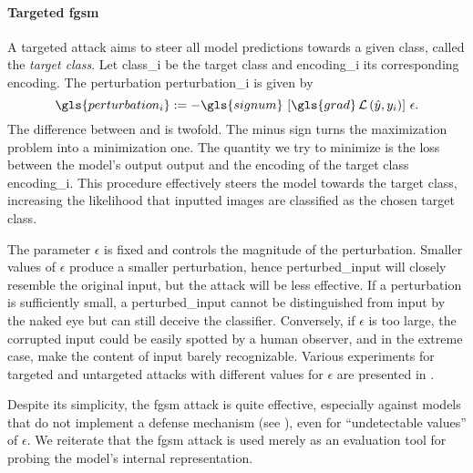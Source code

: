 \paragraph{Targeted \acrshort{fgsm}} A targeted attack aims to steer all model predictions towards a given class, called the \emph{target class}. Let \gls{class_i} be the target class and \gls{encoding_i} its corresponding encoding. The perturbation \gls{perturbation_i} is given by
\begin{equation}
  \gls{perturbation_i} :=
  - \gls{signum} \, \left[\gls{grad} \Loss\left(\hat{y}, y_i\right)\right] \, \epsilon.
  \label{eq:targeted-perturbation}
\end{equation}
The difference between  and  is twofold. The minus sign turns the maximization problem into a minimization one. The quantity we try to minimize is the loss between the model's output \gls{output} and the encoding of the target class \gls{encoding_i}. This procedure effectively steers the model towards the target class, increasing the likelihood that inputted images are classified as the chosen target class.\medskip

The parameter $\epsilon$ is fixed and controls the magnitude of the perturbation. Smaller values of $\epsilon$ produce a smaller perturbation, hence \gls{perturbed_input} will closely resemble the original \gls{input}, but the attack will be less effective. If a perturbation is sufficiently small, a \gls{perturbed_input} cannot be distinguished from \gls{input} by the naked eye but can still deceive the classifier. Conversely, if $\epsilon$ is too large, the corrupted input could be easily spotted by a human observer, and in the extreme case, make the content of \gls{input} barely recognizable. Various experiments for targeted and untargeted attacks with different values for $\epsilon$ are presented in .\medskip

Despite its simplicity, the \gls{fgsm} attack is quite effective, especially against models that do not implement a defense mechanism (see ), even for ``undetectable values'' of $\epsilon$. We reiterate that the \gls{fgsm} attack is used merely as an evaluation tool for probing the model's internal representation.

